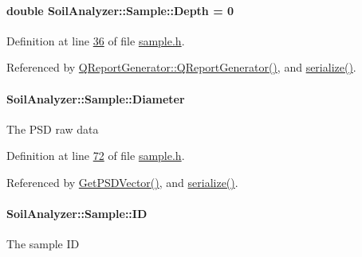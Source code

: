 \hypertarget{class_soil_analyzer_1_1_sample_a61d5788ae61e9fd62f8bff35bd0bc068}{}
\paragraph[{Depth}]{\setlength{\rightskip}{0pt plus 5cm}double Soil\+Analyzer\+::\+Sample\+::\+Depth = 0}\label{class_soil_analyzer_1_1_sample_a61d5788ae61e9fd62f8bff35bd0bc068}


Definition at line \hyperlink{sample_8h_source_l00036}{36} of file \hyperlink{sample_8h_source}{sample.\+h}.



Referenced by \hyperlink{qreportgenerator_8cpp_source_l00004}{Q\+Report\+Generator\+::\+Q\+Report\+Generator()}, and \hyperlink{sample_8h_source_l00085}{serialize()}.

\hypertarget{class_soil_analyzer_1_1_sample_a466996e4055155a1d6a6843828c5c205}{}
\paragraph[{Diameter}]{ Soil\+Analyzer\+::\+Sample\+::\+Diameter\hspace{0.3cm}{\ttfamily [private]}}\label{class_soil_analyzer_1_1_sample_a466996e4055155a1d6a6843828c5c205}
The P\+S\+D raw data 

Definition at line \hyperlink{sample_8h_source_l00072}{72} of file \hyperlink{sample_8h_source}{sample.\+h}.



Referenced by \hyperlink{sample_8cpp_source_l00061}{Get\+P\+S\+D\+Vector()}, and \hyperlink{sample_8h_source_l00085}{serialize()}.

\hypertarget{class_soil_analyzer_1_1_sample_a5eab03e759ae5754000ad10c30e75d15}{}
\paragraph[{I\+D}]{ Soil\+Analyzer\+::\+Sample\+::\+I\+D}\label{class_soil_analyzer_1_1_sample_a5eab03e759ae5754000ad10c30e75d15}
The sample I\+D 

